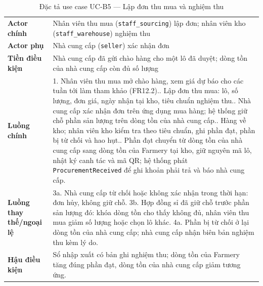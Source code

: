 \begingroup
\tblsetup
\begin{longtable}{L{3.00cm} L{12.25cm}}
\caption{Đặc tả use case UC-B5 --- Lập đơn thu mua và nghiệm thu}
\label{tab:uc-b5} \\
\toprule
{}
 \\
\midrule
\endfirsthead
\bottomrule
\endfoot
\textbf{Actor chính} & Nhân viên thu mua (\texttt{staff\_sourcing}) lập đơn; nhân viên kho (\texttt{staff\_warehouse}) nghiệm thu \\
\textbf{Actor phụ} & Nhà cung cấp (\texttt{seller}) xác nhận đơn \\
\textbf{Tiền điều kiện} & Nhà cung cấp đã gửi chào hàng cho một lô đã duyệt; dòng tồn của nhà cung cấp còn đủ số lượng \\
\textbf{Luồng chính} &
1. Nhân viên thu mua mở chào hàng, xem giá dự báo cho các tuần tới làm tham khảo (FR12.2).. Lập đơn thu mua: lô, số lượng, đơn giá, ngày nhận tại kho, tiêu chuẩn nghiệm thu.. Nhà cung cấp xác nhận đơn trên ứng dụng mua hàng; hệ thống giữ chỗ phần sản lượng trên dòng tồn của nhà cung cấp.. Hàng về kho; nhân viên kho kiểm tra theo tiêu chuẩn, ghi phần đạt, phần bị từ chối và hao hụt.. Phần đạt chuyển từ dòng tồn của nhà cung cấp sang dòng tồn của Farmery tại kho, giữ nguyên mã lô, nhật ký canh tác và mã QR; hệ thống phát \texttt{ProcurementReceived} để ghi khoản phải trả và báo nhà cung cấp. \\
\textbf{Luồng thay thế/ngoại lệ} &
3a. Nhà cung cấp từ chối hoặc không xác nhận trong thời hạn: đơn hủy, không giữ chỗ.\newline
3b. Hợp đồng sỉ đã giữ chỗ trước phần sản lượng đó: khóa dòng tồn cho thấy không đủ, nhân viên thu mua giảm số lượng hoặc chọn lô khác.\newline
4a. Phần bị từ chối ở lại dòng tồn của nhà cung cấp; nhà cung cấp nhận biên bản nghiệm thu kèm lý do. \\
\textbf{Hậu điều kiện} & Sổ nhập xuất có bản ghi nghiệm thu; dòng tồn của Farmery tăng đúng phần đạt, dòng tồn của nhà cung cấp giảm tương ứng. \\
\end{longtable}
\endgroup


